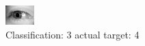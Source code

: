 \begin{figure}[h!]
\begin{center}
\includegraphics[width=0.60\columnwidth]{figures/ID3225_class_3_target_4.png}
\end{center}
\caption{ Classification: 3 actual target: 4}
\label{fig:ID3225_class_3_target_4}
\end{figure}
